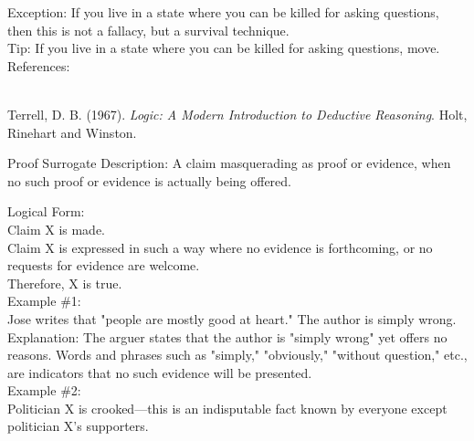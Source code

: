 \documentclass[a4paper,12pt,single,pdftex]{scrbook}
\begin{document}
    
      Exception: If you live in a state where you can be killed for asking questions, then this is not a fallacy, but a survival technique.
    \\

    
      Tip: If you live in a state where you can be killed for asking questions, move.
    \\

    References:

    
      
        
      \\

      
        
          Terrell, D. B. (1967). {\it Logic: A Modern Introduction to Deductive Reasoning}. Holt, Rinehart and Winston.
        
      
    
  

Proof Surrogate
    Description: A claim masquerading as proof or evidence, when no such proof or evidence is actually being offered.

    
      Logical Form:
    \\

    
      Claim X is made.
    \\

    
      Claim X is expressed in such a way where no evidence is forthcoming, or no requests for evidence are welcome.
    \\

    
      Therefore, X is true.
    \\

    
      Example \#1:
    \\

    
      Jose writes that "people are mostly good at heart." The author is simply wrong.
    \\

    
      Explanation: The arguer states that the author is "simply wrong" yet offers no reasons. Words and phrases such as "simply," "obviously," "without question," etc., are indicators that no such evidence will be presented.
    \\

    
      Example \#2:
    \\

    
      Politician X is crooked—this is an indisputable fact known by everyone except politician X's supporters.
    \\
\end{document}
